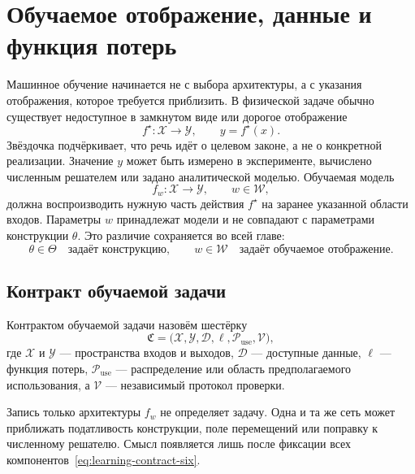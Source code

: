 \section{Обучаемое отображение, данные и функция потерь}
\label{sec:ml-map-data-loss}
Машинное обучение начинается не с выбора архитектуры, а с указания отображения, которое требуется приблизить. В физической задаче обычно существует недоступное в замкнутом виде или дорогое отображение
\begin{equation}
 f^\star:\mathcal X\to\mathcal Y,
 \qquad
 y=f^\star(x).
\end{equation}
Звёздочка подчёркивает, что речь идёт о целевом законе, а не о конкретной реализации. Значение $y$ может быть измерено в эксперименте, вычислено численным решателем или задано аналитической моделью. Обучаемая модель
\begin{equation}
 f_w:\mathcal X\to\mathcal Y,
 \qquad
 w\in\mathcal W,
\end{equation}
должна воспроизводить нужную часть действия $f^\star$ на заранее указанной области входов. Параметры $w$ принадлежат модели и не совпадают с параметрами конструкции $\theta$. Это различие сохраняется во всей главе:
\begin{equation}
 \theta\in\Theta
 \quad\text{задаёт конструкцию},
 \qquad
 w\in\mathcal W
 \quad\text{задаёт обучаемое отображение}.
\end{equation}

\subsection{Контракт обучаемой задачи}
\begin{definition}
Контрактом обучаемой задачи назовём шестёрку
\begin{equation}
\label{eq:learning-contract-six}
 \mathfrak C
 =
 \bigl(
 \mathcal X,
 \mathcal Y,
 \mathcal D,
 \ell,
 \mathcal P_{\mathrm{use}},
 \mathcal V
 \bigr),
\end{equation}
где $\mathcal X$ и $\mathcal Y$ --- пространства входов и выходов, $\mathcal D$ --- доступные данные, $\ell$ --- функция потерь, $\mathcal P_{\mathrm{use}}$ --- распределение или область предполагаемого использования, а $\mathcal V$ --- независимый протокол проверки.
\end{definition}

Запись только архитектуры $f_w$ не определяет задачу. Одна и та же сеть может приближать податливость конструкции, поле перемещений или поправку к численному решателю. Смысл появляется лишь после фиксации всех компонентов~\eqref{eq:learning-contract-six}.

